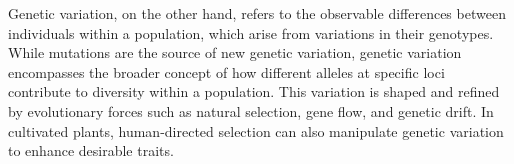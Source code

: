 Genetic variation, on the other hand, refers to the observable differences between individuals within a population, which arise from variations in their genotypes. While mutations are the source of new genetic variation, genetic variation encompasses the broader concept of how different alleles at specific loci contribute to diversity within a population. This variation is shaped and refined by evolutionary forces such as natural selection, gene flow, and genetic drift. In cultivated plants, human-directed selection can also manipulate genetic variation to enhance desirable traits. \cite{merrick2016}